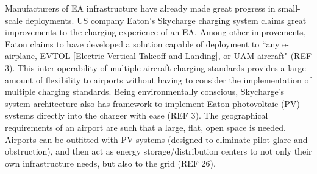 \documentclass{article}
\begin{document}
Manufacturers of EA infrastructure have already made great progress in small-scale deployments. 
US company Eaton’s Skycharge charging system claims great improvements to the charging experience of an EA. 
Among other improvements,  Eaton claims to have developed a solution capable of deployment to “any e-airplane, EVTOL [Electric Vertical Takeoff and Landing], or UAM aircraft" (REF 3). 
This inter-operability of multiple aircraft charging standards provides a large amount of flexibility to airports without having to consider the implementation of multiple charging standards. 
Being environmentally conscious, Skycharge’s system architecture also has framework to implement Eaton photovoltaic (PV) systems directly into the charger with ease (REF 3). 
The geographical requirements of an airport are such that a large, flat, open space is needed. 
Airports can be outfitted with PV systems (designed to eliminate pilot glare and obstruction), and then act as energy storage/distribution centers to not only their own infrastructure needs, but also to the grid (REF 26).\par
\end{document}
